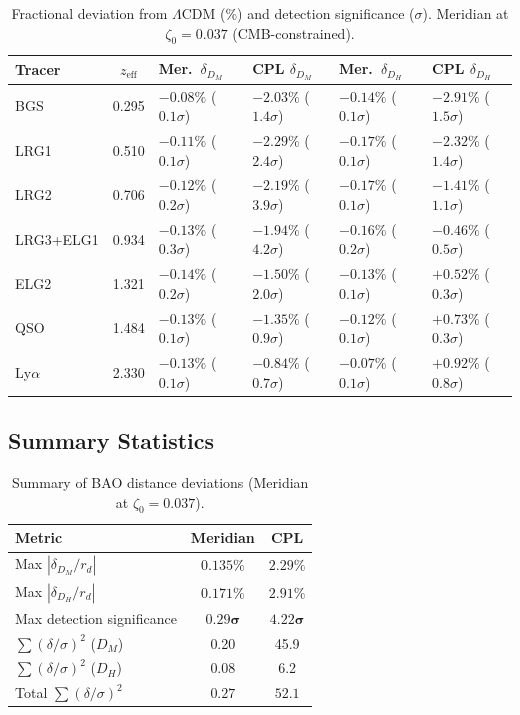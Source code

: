\begin{table}[htbp]
\centering
\caption{Fractional deviation from $\Lambda$CDM (\%) and detection significance ($\sigma$). Meridian at $\zeta_0 = 0.037$ (CMB-constrained).}
\label{tab:2-deviations}
\footnotesize
\begin{tabular}{lcllll}
\toprule
Tracer & $z_\mathrm{eff}$ & Mer.\ $\delta_{D_M}$ & CPL $\delta_{D_M}$ & Mer.\ $\delta_{D_H}$ & CPL $\delta_{D_H}$ \\
\midrule
BGS & 0.295 &
  $-0.08\%$ ($0.1\sigma$) & $-2.03\%$ ($1.4\sigma$) &
  $-0.14\%$ ($0.1\sigma$) & $-2.91\%$ ($1.5\sigma$) \\
LRG1 & 0.510 &
  $-0.11\%$ ($0.1\sigma$) & $-2.29\%$ ($2.4\sigma$) &
  $-0.17\%$ ($0.1\sigma$) & $-2.32\%$ ($1.4\sigma$) \\
LRG2 & 0.706 &
  $-0.12\%$ ($0.2\sigma$) & $-2.19\%$ ($3.9\sigma$) &
  $-0.17\%$ ($0.1\sigma$) & $-1.41\%$ ($1.1\sigma$) \\
LRG3+ELG1 & 0.934 &
  $-0.13\%$ ($0.3\sigma$) & $-1.94\%$ ($4.2\sigma$) &
  $-0.16\%$ ($0.2\sigma$) & $-0.46\%$ ($0.5\sigma$) \\
ELG2 & 1.321 &
  $-0.14\%$ ($0.2\sigma$) & $-1.50\%$ ($2.0\sigma$) &
  $-0.13\%$ ($0.1\sigma$) & $+0.52\%$ ($0.3\sigma$) \\
QSO & 1.484 &
  $-0.13\%$ ($0.1\sigma$) & $-1.35\%$ ($0.9\sigma$) &
  $-0.12\%$ ($0.1\sigma$) & $+0.73\%$ ($0.3\sigma$) \\
Ly$\alpha$ & 2.330 &
  $-0.13\%$ ($0.1\sigma$) & $-0.84\%$ ($0.7\sigma$) &
  $-0.07\%$ ($0.1\sigma$) & $+0.92\%$ ($0.8\sigma$) \\
\bottomrule
\end{tabular}
\end{table}

\subsection{Summary Statistics}
\label{sec:2-DESI-summary}

\begin{table}[htbp]
\centering
\caption{Summary of BAO distance deviations (Meridian at $\zeta_0 = 0.037$).}
\label{tab:2-BAO-summary}
\begin{tabular}{lcc}
\toprule
Metric & Meridian & CPL \\
\midrule
Max $|\delta_{D_M}/r_d|$ & $0.135\%$ & $2.29\%$ \\
Max $|\delta_{D_H}/r_d|$ & $0.171\%$ & $2.91\%$ \\
Max detection significance & $\mathbf{0.29\sigma}$ & $\mathbf{4.22\sigma}$ \\
$\sum(\delta/\sigma)^2$ ($D_M$) & 0.20 & 45.9 \\
$\sum(\delta/\sigma)^2$ ($D_H$) & 0.08 & 6.2 \\
Total $\sum(\delta/\sigma)^2$ & $\mathbf{0.27}$ & $\mathbf{52.1}$ \\
\bottomrule
\end{tabular}
\end{table}

